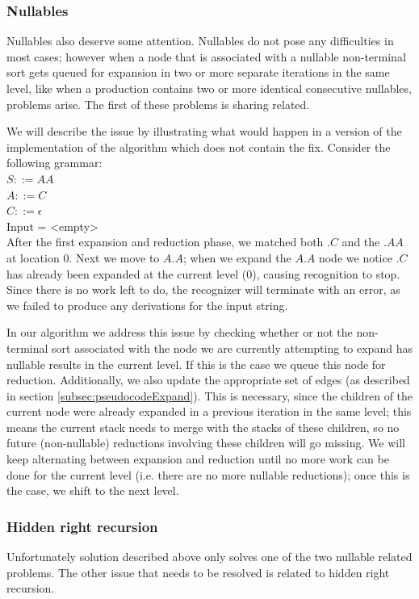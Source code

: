 \documentclass[a4paper,10pt]{article}
\begin{document}
\subsubsection{Nullables}
\label{subsec:nullables}
Nullables also deserve some attention. Nullables do not pose any difficulties in most cases; however when a node that is associated with a nullable non-terminal sort gets queued for expansion in two or more separate iterations in the same level, like when a production contains two or more identical consecutive nullables, problems arise. The first of these problems is sharing related.

We will describe the issue by illustrating what would happen in a version of the implementation of the algorithm which does not contain the fix.
Consider the following grammar:\\
$S ::= AA$\\
$A ::= C$\\
$C ::= \epsilon$\\
Input = <empty>\\
After the first expansion and reduction phase, we matched both $.C$ and the $.AA$ at location $0$. Next we move to $A.A$; when we expand the $A.A$ node we notice $.C$ has already been expanded at the current level ($0$), causing recognition to stop. Since there is no work left to do, the recognizer will terminate with an error, as we failed to produce any derivations for the input string.

In our algorithm we address this issue by checking whether or not the non-terminal sort associated with the node we are currently attempting to expand has nullable results in the current level. If this is the case we queue this node for reduction. Additionally, we also update the appropriate set of edges (as described in section \ref{subsec:pseudocodeExpand}). This is necessary, since the children of the current node were already expanded in a previous iteration in the same level; this means the current stack needs to merge with the stacks of these children, so no future (non-nullable) reductions involving these children will go missing. We will keep alternating between expansion and reduction until no more work can be done for the current level (i.e. there are no more nullable reductions); once this is the case, we shift to the next level.

\subsubsection{Hidden right recursion}
\label{subsec:hiddenRightRecursion}
Unfortunately solution described above only solves one of the two nullable related problems. The other issue that needs to be resolved is related to hidden right recursion.
\end{document}
